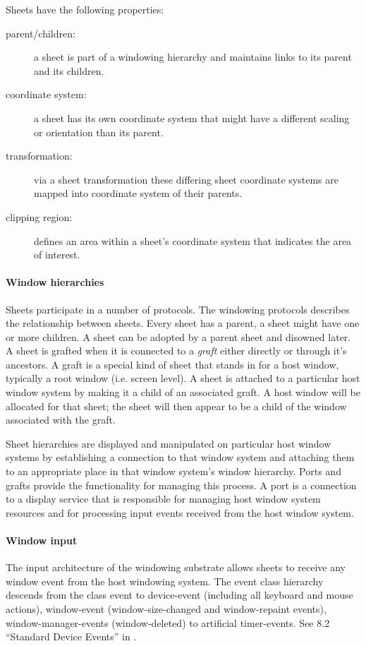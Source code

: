 \documentclass[twocolumn,a4paper]{article}
\newcommand {\concept} [1] {{\sl #1}\index{#1}}
\newcommand {\code}[1]{{\sffamily #1}}
\begin{document}
Sheets have the following properties:
\begin{description}
\item[parent/children:] a sheet is part of a windowing hierarchy and
  maintains links to its parent and its children.
\item[coordinate system:] a sheet has its own coordinate system that
  might have a different scaling or orientation than its parent.
\item[transformation:] via a sheet transformation these differing
  sheet coordinate systems are mapped into coordinate system of their
  parents.
\item[clipping region:] defines an area within a sheet's coordinate
  system that indicates the area of interest.
\end{description}

\paragraph*{Window hierarchies} Sheets participate in a number of
protocols. The windowing protocols describes the relationship between
sheets. Every sheet has a parent, a sheet might have one or more
children. A sheet can be adopted by a parent sheet and disowned later.
A sheet is grafted when it is connected to a \concept{graft} either
directly or through it's ancestors. A graft is a special kind of sheet
that stands in for a host window, typically a root window (i.e. screen
level). A sheet is attached to a particular host window system by
making it a child of an associated graft. A host window will be
allocated for that sheet; the sheet will then appear to be a child of
the window associated with the graft.

Sheet hierarchies are displayed and manipulated on particular host
window systems by establishing a connection to that window system and
attaching them to an appropriate place in that window system's window
hierarchy. Ports and grafts provide the functionality for managing
this process. A port is a connection to a display service that is
responsible for managing host window system resources and for
processing input events received from the host window system.

\paragraph*{Window input} The input architecture of the windowing
substrate allows sheets to receive any window event from the host
windowing system. The event class hierarchy descends from the class
\code{event} to \code{device-event} (including all keyboard and mouse
actions), \code{window-event} (window-size-changed and window-repaint
events), \code{window-manager-events} (window-deleted) to artificial
\code{timer-events}. See 8.2 ``Standard Device Events'' in
\cite{clim-spec}.
\end{document}
